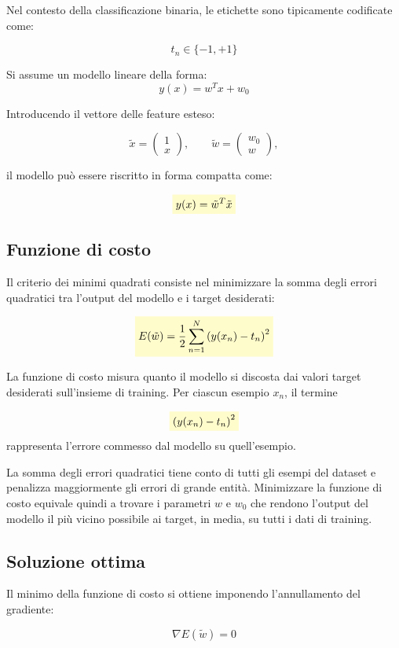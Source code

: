 \documentclass[a4paper,12pt]{report}
\newcommand{\highlight}[1]{%
\colorbox{yellow!20}{$\displaystyle #1$}%
}
\begin{document}
Nel contesto della classificazione binaria, le etichette sono tipicamente codificate come:

\[
t_n \in \{-1, +1\}
\]

Si assume un modello lineare della forma:
\[
y(x) = w^T x + w_0
\]

Introducendo il vettore delle feature esteso:

\[
\tilde{x} = \begin{pmatrix} 1 \\ x \end{pmatrix},
\qquad
\tilde{w} = \begin{pmatrix} w_0 \\ w \end{pmatrix},
\]

il modello può essere riscritto in forma compatta come:

\[
\highlight{
y(x) = \tilde{w}^T \tilde{x}}
\]

\subsection{Funzione di costo}

Il criterio dei minimi quadrati consiste nel minimizzare la somma degli errori quadratici tra l’output del modello e i target desiderati:

\[
\highlight{
E(\tilde{w}) = \frac{1}{2} \sum_{n=1}^{N} \left( y(x_n) - t_n \right)^2}
\]

La funzione di costo misura quanto il modello si discosta dai valori target desiderati sull’insieme di training.
Per ciascun esempio \( x_n \), il termine

\[
\highlight{
\left( y(x_n) - t_n \right)^2}
\]
rappresenta l’errore commesso dal modello su quell’esempio.

La somma degli errori quadratici tiene conto di tutti gli esempi del dataset e penalizza maggiormente gli errori di grande entità.
Minimizzare la funzione di costo equivale quindi a trovare i parametri \( w \) e \( w_0 \) che rendono l’output del modello il più vicino possibile ai target, in media, su tutti i dati di training.


\subsection{Soluzione ottima}

Il minimo della funzione di costo si ottiene imponendo l’annullamento del gradiente:

\[
\nabla E(\tilde{w}) = 0
\]
\end{document}
